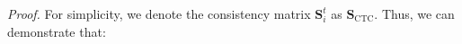 \emph{Proof.}
    For simplicity, we denote the consistency matrix $\mathbf{S}^t_{i}$ as $\mathbf{S}_{\mathrm{CTC}}$. Thus, we can demonstrate that:
